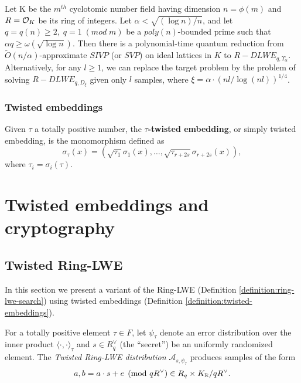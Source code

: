 \documentclass[a4paper,12pt]{article}
\begin{document}
\begin{theorem}
  Let K be the $m^{th}$ cyclotomic number field having dimension $n = \phi(m)$ and $R =
  \mathcal{O}_K$ be its ring of integers. Let $\alpha < \sqrt{(\log{n})/n}$, and let $q = q(n)
  \geq 2, \; q = 1 \; (mod \; m)$ be a $poly(n)$-bounded prime such that $\alpha q \geq
  \omega(\sqrt{\log{n}})$. Then there is a polynomial-time quantum reduction from
  $\tilde{O}(n/\alpha)$-approximate $SIVP$ (or $SVP$) on ideal lattices in $K$ to
  $R-DLWE_{q,\Upsilon_\alpha}$. Alternatively, for any $l \geq 1$, we can replace the target
  problem by the problem of solving $R-DLWE_{q,D_\xi}$ given only $l$ samples,
  where $\xi = \alpha \cdot ( nl/ \log{(nl)} )^{1/4}$.
\end{theorem}
\subsubsection{Twisted embeddings}
\label{sec:org68c912f}

\begin{definition}
  \label{definition:twisted-embeddings}
  Given $\tau$ a totally positive number, the \textbf{$\tau$-twisted embedding}, or
  simply twisted embedding, is the monomorphism defined as
  \begin{equation*}
    \sigma_\tau(x) = \left( \sqrt{\tau_1}\sigma_1(x), \dots, \sqrt{\tau_{r+2s}}\sigma_{r+2s}(x) \right),
  \end{equation*}
where $\tau_i = \sigma_i(\tau)$.
\end{definition}
\section{Twisted embeddings and cryptography}
\label{twisted-embeddings-and-cryptography}
\subsection{Twisted Ring-LWE}
\label{sec:org81b7778}
In this section we present a variant of the Ring-LWE (Definition \ref{definition:ring-lwe-search}) using twisted embeddings (Definition \ref{definition:twisted-embeddings}).

\begin{definition}
  \label{definition:twisted-ring-lwe}
  For a totally positive element $\tau \in F$, let $\psi_\tau$ denote an error distribution
  over the inner product $\langle{\cdot,\cdot}\rangle_\tau$ and $s \in R^\vee_q$ (the “secret”) be an
  uniformly randomized element. The \emph{Twisted Ring-LWE distribution}
  $\mathcal{A}_{s,\psi_\tau}$ produces samples of the form
  $$
  a, b = a \cdot s + e \pmod{qR^\vee} \in R_q \times K_{\mathbb{R}}/qR^\vee.
  $$
\end{definition}
\end{document}
